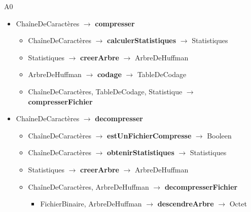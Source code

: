 A0
\begin{itemize}
	\item ChaîneDeCaractères $\rightarrow$ \textbf{compresser}
    \begin{itemize}
		\item ChaîneDeCaractères $\rightarrow$ \textbf{calculerStatistiques} $\rightarrow$ Statistiques
		\item Statistiques $\rightarrow$ \textbf{creerArbre} $\rightarrow$ ArbreDeHuffman
		\item ArbreDeHuffman $\rightarrow$ \textbf{codage} $\rightarrow$ TableDeCodage
		\item ChaîneDeCaractères, TableDeCodage, Statistique $\rightarrow$ \textbf{compresserFichier}
    \end{itemize}
	\item ChaîneDeCaractères $\rightarrow$ \textbf{decompresser}
    \begin{itemize}
        \item ChaîneDeCaractères $\rightarrow$ \textbf{estUnFichierCompresse} $\rightarrow$ Booleen
		\item ChaîneDeCaractères $\rightarrow$ \textbf{obtenirStatistiques} $\rightarrow$ Statistiques
		\item Statistiques $\rightarrow$ \textbf{creerArbre} $\rightarrow$ ArbreDeHuffman
		\item ChaîneDeCaractères, ArbreDeHuffman $\rightarrow$ \textbf{decompresserFichier}
        \begin{itemize}
            \item FichierBinaire, ArbreDeHuffman $\rightarrow$ \textbf{descendreArbre} $\rightarrow$ Octet
        \end{itemize}
    \end{itemize}
\end{itemize}  
